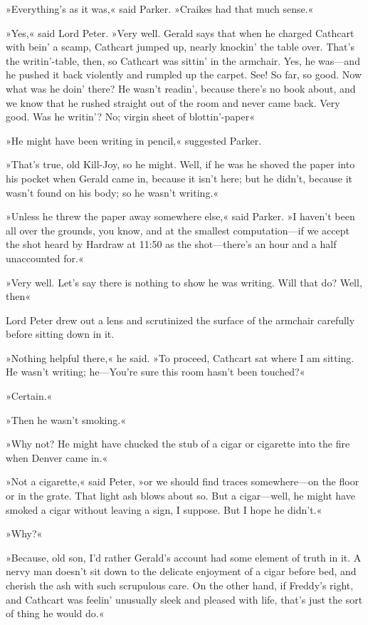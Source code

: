 »Everything's as it was,« said Parker. »Craikes had that much sense.«

»Yes,« said Lord Peter. »Very well. Gerald says that when he charged Cathcart with bein' a scamp, Cathcart jumped up, nearly knockin' the table over. That's the writin'-table, then, so Cathcart was sittin' in the armchair. Yes, he was\allowbreak---\allowbreak and he pushed it back violently and rumpled up the carpet. See! So far, so good. Now what was he doin' there? He wasn't readin', because there's no book about, and we know that he rushed straight out of the room and never came back. Very good. Was he writin'? No; virgin sheet of blottin'-paper\longdash«

»He might have been writing in pencil,« suggested Parker.

»That's true, old Kill-Joy, so he might. Well, if he was he shoved the paper into his pocket when Gerald came in, because it isn't here; but he didn't, because it wasn't found on his body; so he wasn't writing.«

»Unless he threw the paper away somewhere else,« said Parker. »I haven't been all over the grounds, you know, and at the smallest computation\allowbreak---\allowbreak if we accept the shot heard by Hardraw at 11:50 as the shot\allowbreak---\allowbreak there's an hour and a half unaccounted for.«

»Very well. Let's say there is nothing to show he was writing. Will that do? Well, then\longdash«

Lord Peter drew out a lens and scrutinized the surface of the armchair carefully before sitting down in it.

»Nothing helpful there,« he said. »To proceed, Cathcart sat where I am sitting. He wasn't writing; he\allowbreak---\allowbreak You're sure this room hasn't been touched?«

»Certain.«

»Then he wasn't smoking.«

»Why not? He might have chucked the stub of a cigar or cigarette into the fire when Denver came in.«

»Not a cigarette,« said Peter, »or we should find traces somewhere\allowbreak---\allowbreak on the floor or in the grate. That light ash blows about so. But a cigar\allowbreak---\allowbreak well, he might have smoked a cigar without leaving a sign, I suppose. But I hope he didn't.«

»Why?«

»Because, old son, I'd rather Gerald's account had some element of truth in it. A nervy man doesn't sit down to the delicate enjoyment of a cigar before bed, and cherish the ash with such scrupulous care. On the other hand, if Freddy's right, and Cathcart was feelin' unusually sleek and pleased with life, that's just the sort of thing he would do.«

